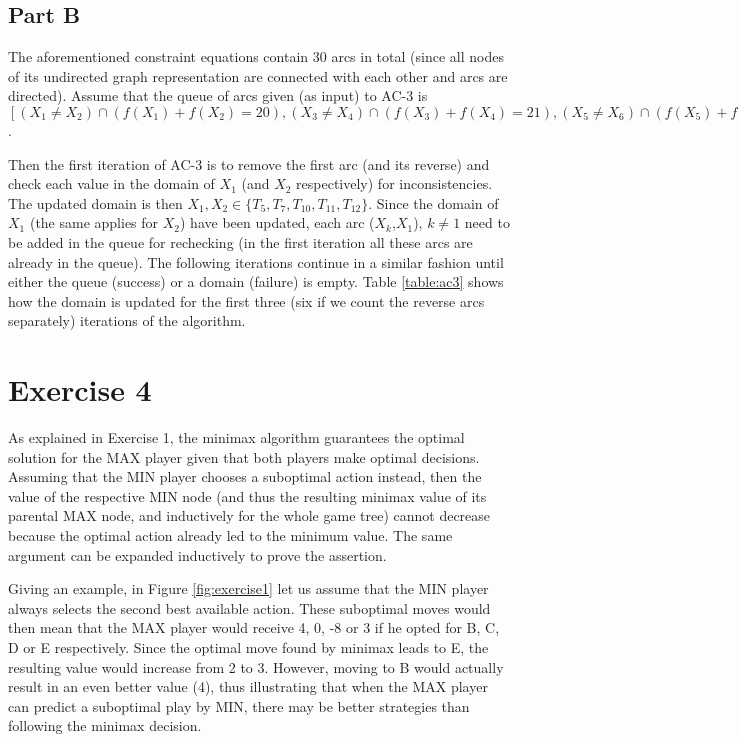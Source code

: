 \subsection*{Part B}



The aforementioned constraint equations contain 30 arcs in total (since all nodes of its undirected graph representation are connected with each other and arcs are directed). Assume that the queue of arcs given (as input) to AC-3 is $[(X_1 \ne X_2) \cap (f(X_1) + f(X_2) = 20), (X_3 \ne X_4) \cap (f(X_3) + f(X_4) = 21), (X_5 \ne X_6) \cap (f(X_5) + f(X_6) = 22), X_1 \ne X_3, X_1 \ne X_4, ..., X_4 \ne X_6]$.

Then the first iteration of AC-3 is to remove the first arc (and its reverse) and check each value in the domain of $X_1$ (and $X_2$ respectively) for inconsistencies. The updated domain is then $X_1, X_2 \in \{T_5, T_7, T_{10}, T_{11}, T_{12}\}$. Since the domain of $X_1$ (the same applies for $X_2$) have been updated, each arc ($X_k$,$X_1$), $k\ne1$ need to be added in the queue for rechecking (in the first iteration all these arcs are already in the queue). The following iterations continue in a similar fashion until either the queue (success) or a domain (failure) is empty. Table \ref{table:ac3} shows how the domain is updated for the first three (six if we count the reverse arcs separately) iterations of the algorithm.


\section*{Exercise 4}

As explained in Exercise 1, the minimax algorithm guarantees the optimal solution for the MAX player given that both players make optimal decisions. Assuming that the MIN player chooses a suboptimal action instead, then the value of the respective MIN node (and thus the resulting minimax value of its parental MAX node, and inductively for the whole game tree) cannot decrease because the optimal action already led to the minimum value. The same argument can be expanded inductively to prove the assertion.

Giving an example, in Figure \ref{fig:exercise1} let us assume that the MIN player always selects the second best available action. These suboptimal moves would then mean that the MAX player would receive 4, 0, -8 or 3 if he opted for B, C, D or E respectively. Since the optimal move found by minimax leads to E, the resulting value would increase from 2 to 3. However, moving to B would actually result in an even better value (4), thus illustrating that when the MAX player can predict a suboptimal play by MIN, there may be better strategies than following the minimax decision.


